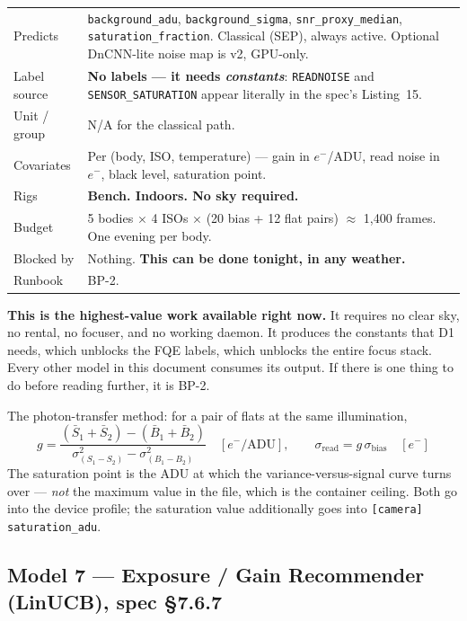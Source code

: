 \documentclass[11pt]{article}
\newcommand{\co}[1]{\texttt{\small #1}}
\begin{document}
\begin{center}
\small
\begin{tabular}{@{}p{}p{}@{}}
\toprule
Predicts & \co{background\_adu}, \co{background\_sigma}, \co{snr\_proxy\_median}, \co{saturation\_fraction}. Classical (SEP), always active. Optional DnCNN-lite noise map is v2, GPU-only. \\
Label source & \textbf{No labels --- it needs \emph{constants}}: \co{READNOISE} and \co{SENSOR\_SATURATION} appear literally in the spec's Listing~15. \\
Unit / group & N/A for the classical path. \\
Covariates & Per (body, ISO, temperature) --- gain in $e^-$/ADU, read noise in $e^-$, black level, saturation point. \\
Rigs & \textbf{Bench. Indoors. No sky required.} \\
Budget & 5 bodies $\times$ 4 ISOs $\times$ (20 bias + 12 flat pairs) $\approx$ 1,400 frames. One evening per body. \\
Blocked by & Nothing. \textbf{This can be done tonight, in any weather.} \\
Runbook & BP-2. \\
\bottomrule
\end{tabular}
\end{center}

\begin{okbox}
\textbf{This is the highest-value work available right now.} It requires no
clear sky, no rental, no focuser, and no working daemon. It produces the
constants that D1 needs, which unblocks the FQE labels, which unblocks the
entire focus stack. Every other model in this document consumes its output. If
there is one thing to do before reading further, it is BP-2.
\end{okbox}

The photon-transfer method: for a pair of flats at the same illumination,
\[
g = \frac{(\bar{S}_1 + \bar{S}_2) - (\bar{B}_1 + \bar{B}_2)}
         {\sigma^2_{(S_1 - S_2)} - \sigma^2_{(B_1 - B_2)}}
\quad [e^-/\mathrm{ADU}], \qquad
\sigma_{\mathrm{read}} = g\,\sigma_{\mathrm{bias}} \quad [e^-]
\]
The saturation point is the ADU at which the variance-versus-signal curve turns
over --- \emph{not} the maximum value in the file, which is the container
ceiling. Both go into the device profile; the saturation value additionally goes
into \co{[camera] saturation\_adu}.

\subsection{Model 7 --- Exposure / Gain Recommender (LinUCB), spec \S7.6.7}\label{m:bandit}
\end{document}
